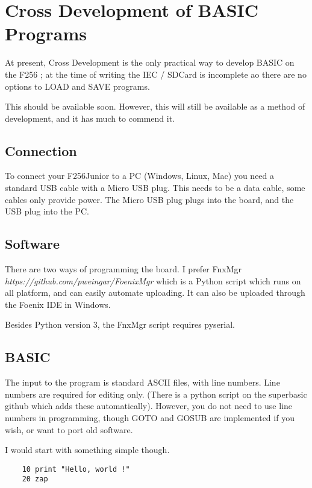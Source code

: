 \chapter{Cross Development of BASIC Programs}

At present, Cross Development is the only practical way to develop BASIC on the F256 ; at the time of writing the IEC / SDCard is incomplete ao there are no options to LOAD and SAVE programs. 

This should be available soon. However, this will still be available as a method of development, and it has much to commend it.

\section{Connection}

To connect your F256Junior to a PC (Windows, Linux, Mac) you need a standard USB cable with a Micro USB plug. This needs to be a data cable, some cables only provide power. The Micro USB plug plugs into the board, and the USB plug into the PC.

\section{Software}

There are two ways of programming the board. I prefer FnxMgr \emph{https://github.com/pweingar/FoenixMgr} which is a Python script which runs on all platform, and can easily automate uploading. It can also be uploaded through the Foenix IDE in Windows\underline{}.

Besides Python version 3, the FnxMgr script requires pyserial.

\section{BASIC}

The input to the program is standard ASCII files, with line numbers. Line numbers are required for editing only. (There is a python script on the superbasic github which adds these automatically). However, you do not need to use line numbers in programming, though GOTO and GOSUB are implemented if you wish, or want to port old software.

I would start with something simple though.

\begin{verbatim}
	10 print "Hello, world !"
	20 zap
\end{verbatim}

